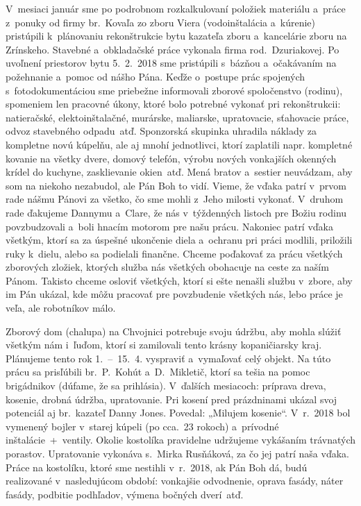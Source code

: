V~mesiaci január sme po podrobnom rozkalkulovaní položiek materiálu a~práce z~ponuky od firmy br.~Kovaľa zo zboru Viera (vodoinštalácia a~kúrenie) pristúpili k~plánovaniu rekonštrukcie bytu kazateľa zboru a~kancelárie zboru na Zrínskeho. Stavebné a~obkladačské práce vykonala firma rod.~Dzuriakovej. Po uvoľnení priestorov bytu 5.~2.~2018 sme pristúpili s~bázňou a~očakávaním na požehnanie a~pomoc od nášho Pána. Keďže o~postupe prác spojených s~fotodokumentáciou sme priebežne informovali zborové spoločenstvo (rodinu), spomeniem len pracovné úkony, ktoré bolo potrebné vykonať pri rekonštrukcii: natieračské, elektoinštalačné, murárske, maliarske, upratovacie, sťahovacie práce, odvoz stavebného odpadu~atď. Sponzorská skupinka uhradila náklady za kompletne novú kúpelňu, ale aj mnohí jednotlivci, ktorí zaplatili napr. kompletné kovanie na všetky dvere, domový telefón, výrobu nových vonkajších okenných krídel do kuchyne, zasklievanie okien~atď. Mená bratov a~sestier neuvádzam, aby som na niekoho nezabudol, ale Pán Boh to vidí.  Vieme, že vďaka patrí v~prvom rade nášmu Pánovi za všetko, čo sme mohli z~Jeho milosti vykonať. V~druhom rade ďakujeme Dannymu a~Clare, že nás v~týždenných listoch pre Božiu rodinu povzbudzovali a~boli hnacím motorom pre našu prácu. Nakoniec patrí vďaka všetkým, ktorí sa za úspešné ukončenie diela a~ochranu pri práci modlili, priložili ruky k~dielu, alebo sa podielali finančne.
Chceme poďakovať za prácu všetkých zborových zložiek, ktorých služba nás všetkých obohacuje na ceste za naším Pánom. Takisto chceme osloviť všetkých, ktorí si ešte nenašli službu v~zbore, aby im Pán ukázal, kde môžu pracovať pre povzbudenie všetkých nás, lebo práce je veľa, ale robotníkov málo.

Zborový dom (chalupa) na Chvojnici potrebuje svoju údržbu, aby mohla slúžiť všetkým nám i~ľuďom, ktorí si zamilovali tento krásny kopaničiarsky kraj. Plánujeme tento rok 1.~--~15.~4. vyspraviť a~vymaľovať celý objekt. Na túto prácu sa prisľúbili br.~P.~Kohút a~D.~Mikletič, ktorí sa tešia na pomoc brigádnikov (dúfame, že sa prihlásia). V~ďalších mesiacoch: príprava dreva, kosenie, drobná údržba, upratovanie. Pri kosení pred prázdninami ukázal svoj potenciál aj br.~kazateľ Danny Jones. Povedal: „Milujem kosenie“. V~r.~2018 bol vymenený bojler v~starej kúpeli (po cca.~23 rokoch) a~prívodné inštalácie~+~ventily. Okolie kostolíka pravidelne udržujeme vykášaním trávnatých porastov. Upratovanie vykonáva s.~Mirka Rusňáková, za čo jej patrí naša vďaka. Práce na kostolíku, ktoré sme nestihli v~r.~2018, ak Pán Boh dá, budú realizované v~nasledujúcom období: vonkajšie odvodnenie, oprava fasády, náter fasády, podbitie podhľadov, výmena bočných dverí~atď.

